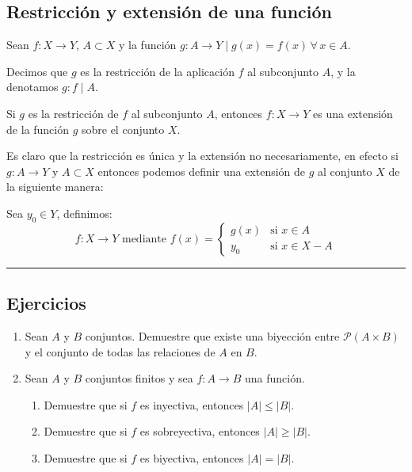 \subsection{Restricción y extensión de una función} \label{sec:restr}
\vspace{3mm}  
\begin{fmd-definition}
	Sean $f:X \rightarrow Y$, $A \subset X$ y la función $g: A \rightarrow Y \mid 
	g(x) = f(x) \, \forall \, x \in A$.
	
	Decimos que $g$ es la restricción de la aplicación $f$ al subconjunto $A$, y
	la denotamos $g:f \mid A$.
\end{fmd-definition}

\begin{fmd-definition}  
	Si $g$ es la restricción de $f$ al subconjunto $A$, entonces $f: X \rightarrow
	Y$ es una extensión de la función $g$ sobre el conjunto $X$.
\end{fmd-definition}
Es claro que la restricción es única y la extensión no necesariamente, en efecto 
si $g: A \rightarrow Y$ y $A \subset X$ entonces podemos definir una extensión de
$g$ al conjunto $X$ de la siguiente manera:

Sea $y_0 \in Y$, definimos: 
\[ f: X \rightarrow Y \mbox{ mediante } f(x) = \begin{cases}
	g(x) & \mbox{si } x \in A\\
	y_0 & \mbox{si } x \in X - A
\end{cases} \]

\rule{\textwidth}{.5pt}

\subsection{Ejercicios}

\begin{enumerate}
	\item Sean $A$ y $B$ conjuntos. Demuestre que existe una biyección entre $\mathcal{P}(A \times B)$ y el conjunto de todas las relaciones de $A$ en $B$.
	
	\item Sean $A$ y $B$ conjuntos finitos y sea $f: A \to B$ una función. 
	\begin{enumerate}
		\item Demuestre que si $f$ es inyectiva, entonces $|A| \leq |B|$.
		\item Demuestre que si $f$ es sobreyectiva, entonces $|A| \geq |B|$.
		\item Demuestre que si $f$ es biyectiva, entonces $|A| = |B|$.
	\end{enumerate}
\end{enumerate}